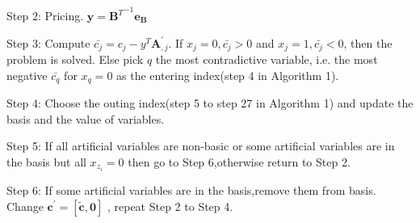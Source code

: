 \documentclass{article}
\begin{document}
Step 2: Pricing. $\mathbf{y} = {\mathbf{B}^T}^{-1}\mathbf{e_B}$

Step 3: Compute $\bar{c_j} = c_j - y^T\mathbf{A}_{,j}^{'}$. If $x_j = 0, \bar{c_j} > 0$ and $x_j = 1,\bar{c_j} < 0$, then the problem is solved. Else pick $q$ the most contradictive variable, i.e. the most negative $\bar{c_q}$ for $x_q = 0$ as the entering index(step 4 in Algorithm 1).

Step 4: Choose the outing index(step 5 to step 27 in Algorithm 1) and update the basis and the value of variables.

Step 5: If all artificial variables are non-basic or some artificial variables are in the basis but all $x_{z_i} = 0$ then go to Step 6,otherwise return to Step 2.

Step 6: If some artificial variables are in the basis,remove them from basis. Change $\mathbf{c^{'}}=[\tilde{\mathbf{c}},\mathbf{0}]$ , repeat Step 2 to Step 4.
\end{document}
